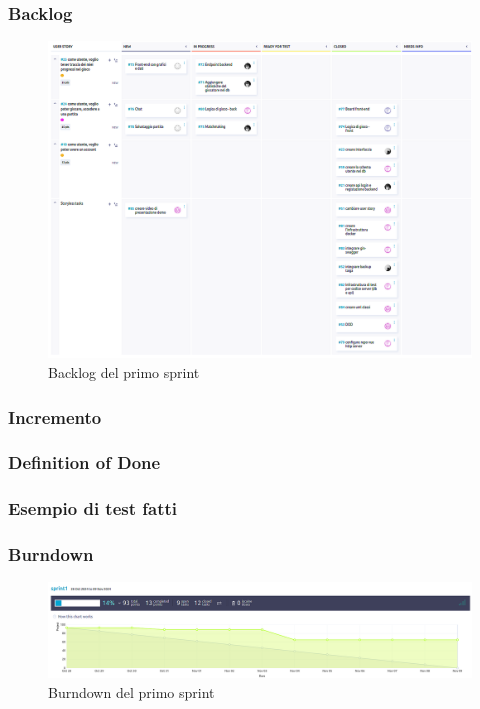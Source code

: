 \documentclass{article}
\begin{document}
\subsubsection{Backlog}
\begin{figure}[H]
    \centering
    \includegraphics[width=1\textwidth]{backlog1}
    \caption{Backlog del primo sprint}
    \label{fig:backlog-s1}
\end{figure}

\subsubsection{Incremento}

\subsubsection{Definition of Done}

\subsubsection{Esempio di test fatti}

\subsubsection{Burndown}
\begin{figure}[H]
    \centering
    \includegraphics[width=1\textwidth]{burndown1}
    \caption{Burndown del primo sprint}
    \label{fig:burndown1}
\end{figure}
\end{document}
